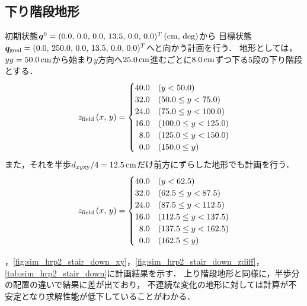 \documentclass[autodetect-engine,dvipdfmx-if-dvi,ja=standard,a4j,jbase=11pt,magstyle=nomag*]{bxjsreport}
\begin{document}
\subsection{下り階段地形}
初期状態$\bm{q}^0 = ( 0.0 ,\, 0.0 ,\, 0.0 ,\, 13.5 ,\, 0.0 ,\, 0.0 )^T\,(\si{\centi\meter} ,\, \mathrm{deg})$から
目標状態$\bm{q}_{\mathrm{goal}} = ( 0.0 ,\, 250.0 ,\, 0.0 ,\, 13.5 ,\, 0.0 ,\, 0.0 )^T$へと向かう計画を行う．
地形としては，$yy = 50.0\,\si{\centi\meter}$から始まり$y$方向へ$25.0\,\si{\centi\meter}$進むごとに$8.0\,\si{\centi\meter}$ずつ下る5段の下り階段とする．
\begin{equation}
    z_{\mathrm{field}}\left( x ,\, y \right) =
        \begin{cases}
            40.0            &   \left( y < 50.0 \right) \\
            32.0            &   \left( 50.0  \leq y  < 75.0 \right) \\
            24.0            &   \left( 75.0  \leq y < 100.0 \right) \\
            16.0            &   \left( 100.0 \leq y < 125.0 \right) \\
            \phantom{0}8.0  &   \left( 125.0 \leq y < 150.0 \right) \\
            \phantom{0}0.0  &   \left( 150.0 \leq y \right)
        \end{cases}
\end{equation}
また，それを半歩$d_{xy \mathrm{xy}} / 4 = 12.5\,\si{\centi\meter}$だけ前方にずらした地形でも計画を行う．
\begin{equation}
    z_{\mathrm{field}}\left( x ,\, y \right) =
        \begin{cases}
            40.0            &   \left( y < 62.5 \right) \\
            32.0            &   \left( 62.5  \leq y  < 87.5 \right) \\
            24.0            &   \left( 87.5  \leq y < 112.5 \right) \\
            16.0            &   \left( 112.5 \leq y < 137.5 \right) \\
            \phantom{0}8.0  &   \left( 137.5 \leq y < 162.5 \right) \\
            \phantom{0}0.0  &   \left( 162.5 \leq y \right)
        \end{cases}
\end{equation}

，\cref{fig:sim_hrp2_stair_down_xy}，\cref{fig:sim_hrp2_stair_down_zdiff}，
\cref{tab:sim_hrp2_stair_down}に計画結果を示す．
上り階段地形と同様に，半歩分の配置の違いで結果に差が出ており，
不連続な変化の地形に対しては計算が不安定となり求解性能が低下していることがわかる．
\end{document}
